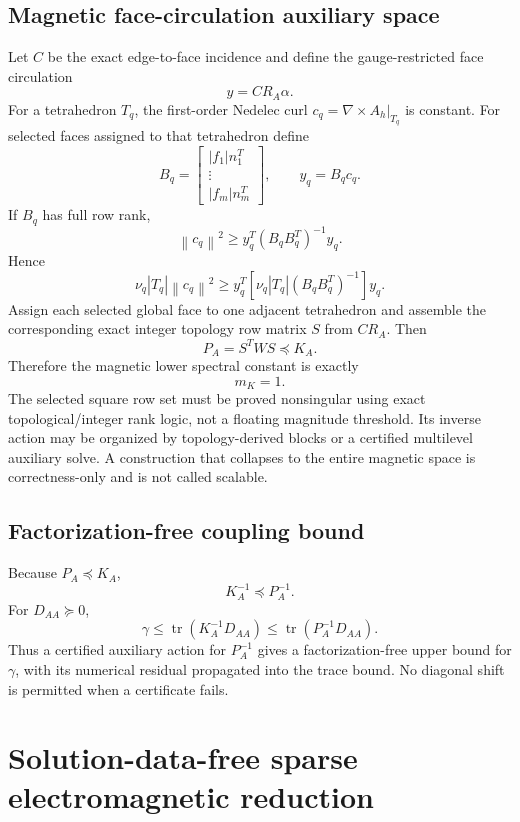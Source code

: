 \documentclass[11pt]{article}
\theoremstyle{remark}
\newcommand{\norm}[1]{\left\lVert #1\right\rVert}
\newcommand{\tr}{\operatorname{tr}}
\begin{document}
\subsection{Magnetic face-circulation auxiliary space}
Let \(C\) be the exact edge-to-face incidence and define the gauge-restricted face circulation
\[
y=CR_A\alpha.
\]
For a tetrahedron \(T_q\), the first-order Nedelec curl \(c_q=\nabla\times A_h|_{T_q}\) is constant. For selected faces assigned to that tetrahedron define
\[
B_q=
\begin{bmatrix}
|f_1|n_1^T\\
\vdots\\
|f_m|n_m^T
\end{bmatrix},
\qquad
y_q=B_qc_q.
\]
If \(B_q\) has full row rank,
\[
\norm{c_q}^2\ge y_q^T(B_qB_q^T)^{-1}y_q.
\]
Hence
\begin{equation}
\nu_q|T_q|\norm{c_q}^2
\ge y_q^T\left[\nu_q|T_q|(B_qB_q^T)^{-1}\right]y_q.
\end{equation}
Assign each selected global face to one adjacent tetrahedron and assemble the corresponding exact integer topology row matrix \(S\) from \(CR_A\). Then
\begin{equation}
\boxed{
P_A=S^TWS\preceq K_A.
}
\label{eq:face_aux_bound}
\end{equation}
Therefore the magnetic lower spectral constant is exactly
\[
\boxed{m_K=1.}
\]
The selected square row set must be proved nonsingular using exact topological/integer rank logic, not a floating magnitude threshold. Its inverse action may be organized by topology-derived blocks or a certified multilevel auxiliary solve. A construction that collapses to the entire magnetic space is correctness-only and is not called scalable.

\subsection{Factorization-free coupling bound}
Because \(P_A\preceq K_A\),
\[
K_A^{-1}\preceq P_A^{-1}.
\]
For \(D_{AA}\succeq0\),
\begin{equation}
\gamma
\le\tr(K_A^{-1}D_{AA})
\le\tr(P_A^{-1}D_{AA}).
\label{eq:gamma_trace_aux}
\end{equation}
Thus a certified auxiliary action for \(P_A^{-1}\) gives a factorization-free upper bound for \(\gamma\), with its numerical residual propagated into the trace bound. No diagonal shift is permitted when a certificate fails.

\section{Solution-data-free sparse electromagnetic reduction}
\end{document}
